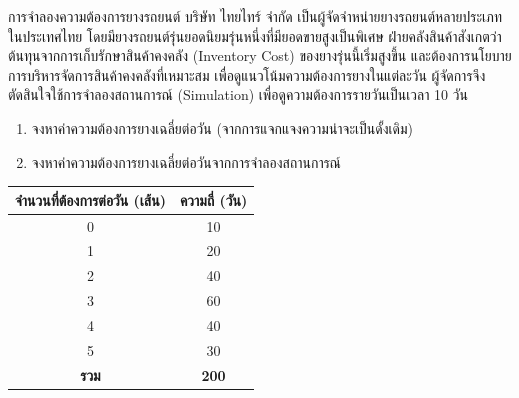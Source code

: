 \begin{example}
    {การจำลองความต้องการยางรถยนต์}{}
    บริษัท ไทยไทร์ จำกัด เป็นผู้จัดจำหน่ายยางรถยนต์หลายประเภทในประเทศไทย โดยมียางรถยนต์รุ่นยอดนิยมรุ่นหนึ่งที่มียอดขายสูงเป็นพิเศษ  
    ฝ่ายคลังสินค้าสังเกตว่าต้นทุนจากการเก็บรักษาสินค้าคงคลัง (Inventory Cost) ของยางรุ่นนี้เริ่มสูงขึ้น และต้องการนโยบายการบริหารจัดการสินค้าคงคลังที่เหมาะสม  
    เพื่อดูแนวโน้มความต้องการยางในแต่ละวัน ผู้จัดการจึงตัดสินใจใช้การจำลองสถานการณ์ (Simulation) เพื่อดูความต้องการรายวันเป็นเวลา 10 วัน 
    \begin{enumerate}
        \item จงหาค่าความต้องการยางเฉลี่ยต่อวัน (จากการแจกแจงความน่าจะเป็นดั้งเดิม)
        \item จงหาค่าความต้องการยางเฉลี่ยต่อวันจากการจำลองสถานการณ์
    \end{enumerate}
\end{example}
\begin{tabular}{|c|c|}
    \hline
    \textbf{จำนวนที่ต้องการต่อวัน (เส้น)} & \textbf{ความถี่ (วัน)} \\
    \hline
    0 & 10 \\
    1 & 20 \\
    2 & 40 \\
    3 & 60 \\
    4 & 40 \\
    5 & 30 \\
    \hline
    \textbf{รวม} & \textbf{200} \\
    \hline
\end{tabular}
\newpage
